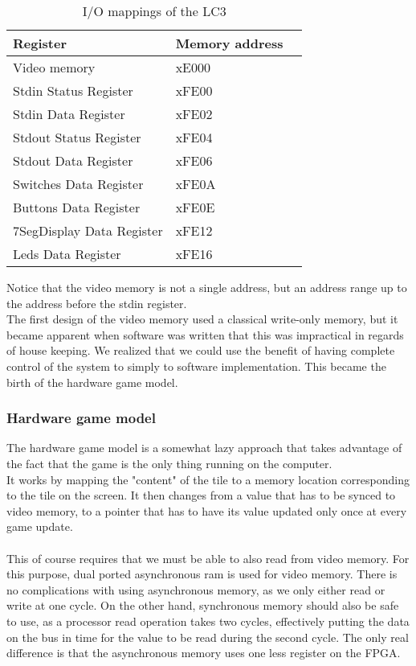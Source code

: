 \documentclass{acm_proc_article-sp}
\begin{document}
\begin{table}[h]
\centering
    \begin{tabular}{ | l | l | l |}
    \hline
     Register & Memory address \\ \hline 
    \hline
    Video memory           & xE000  \\ \hline
    Stdin Status Register  & xFE00  \\ \hline
    Stdin Data Register    & xFE02  \\ \hline
    Stdout Status Register & xFE04  \\ \hline
    Stdout Data Register   & xFE06  \\ \hline
    Switches Data Register & xFE0A  \\ \hline
    Buttons Data Register  & xFE0E  \\ \hline
    7SegDisplay Data Register  & xFE12  \\ \hline
    Leds Data Register  & xFE16  \\ \hline
    \end{tabular}
\caption{I/O mappings of the LC3}
\label{table:io_mappings}
\end{table}
Notice that the video memory is not a single address, but an address range up to the address before the stdin register.\\
The first design of the video memory used a classical write-only memory, but it became apparent when software was written that this was impractical in regards of house keeping. We realized that we could use the benefit of having complete control of the system to simply to software implementation. This became the birth of the hardware game model.
\subsubsection{Hardware game model}
The hardware game model is a somewhat lazy approach that takes advantage of the fact that the game is the only thing running on the computer.\\
It works by mapping the "content" of the tile to a memory location corresponding to the tile on the screen. It then changes from a value that has to be synced to video memory, to a pointer that has to have its value updated only once at every game update.\\\\
This of course requires that we must be able to also read from video memory. For this purpose, dual ported asynchronous ram\cite{chu2008fpga} is used for video memory. There is no complications with using asynchronous memory, as we only either read or write at one cycle. On the other hand, synchronous memory should also be safe to use, as a processor read operation takes two cycles, effectively putting the data on the bus in time for the value to be read during the second cycle. The only real difference is that the asynchronous memory uses one less register on the FPGA.
\end{document}
